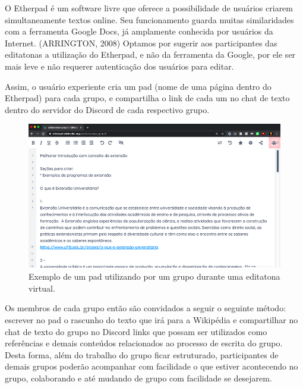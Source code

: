 O Etherpad é um software livre que oferece a possibilidade de usuários criarem simultaneamente textos online. Seu funcionamento guarda muitas similaridades com a ferramenta Google Docs, já amplamente conhecida por usuários da Internet. (ARRINGTON, 2008) Optamos por sugerir aos participantes das editatonas a utilização do Etherpad, e não da ferramenta da Google, por ele ser mais leve e não requerer autenticação dos usuários para editar.

Assim, o usuário experiente cria um pad (nome de uma página dentro do Etherpad) para cada grupo, e compartilha o link de cada um no chat de texto dentro do servidor do Discord de cada respectivo grupo.

\begin{figure}[H]
    \centering
    \includegraphics[width=1\textwidth]{Images/etherpad.png}
    \caption{Exemplo de um pad utilizando por um grupo durante uma editatona virtual.}
    \label{fig:etherpad}
\end{figure}

Os membros de cada grupo então são convidados a seguir o seguinte método: escrever no pad o rascunho do texto que irá para a Wikipédia e compartilhar no chat de texto do grupo no Discord links que possam ser utilizados como referências e demais conteúdos relacionados ao processo de escrita do grupo. Desta forma, além do trabalho do grupo ficar estruturado, participantes de demais grupos poderão acompanhar com facilidade o que estiver acontecendo no grupo, colaborando e até mudando de grupo com facilidade se desejarem.

